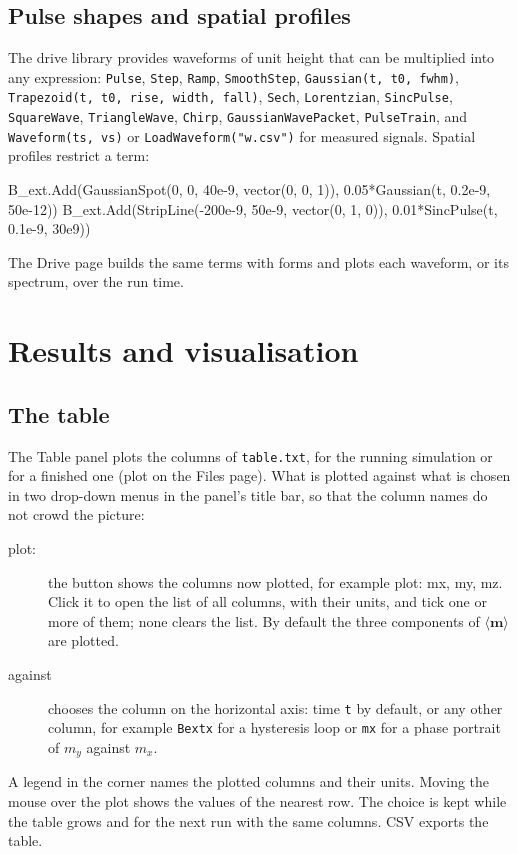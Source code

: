 \documentclass[11pt,a4paper,oneside]{book}
\newcommand{\code}[1]{\texttt{#1}}
\renewcommand{\_}{\textunderscore\allowbreak}
\newcommand{\menu}[1]{\textsf{#1}}
\begin{document}
\section{Pulse shapes and spatial profiles}

The drive library provides waveforms of unit height that can be multiplied into any expression:
\code{Pulse}, \code{Step}, \code{Ramp}, \code{SmoothStep}, \code{Gaussian(t, t0, fwhm)},
\code{Trapezoid(t, t0, rise, width, fall)}, \code{Sech}, \code{Lorentzian}, \code{SincPulse},
\code{SquareWave}, \code{TriangleWave}, \code{Chirp}, \code{GaussianWavePacket}, \code{PulseTrain}, and
\code{Waveform(ts, vs)} or \code{LoadWaveform("w.csv")} for measured signals. Spatial profiles restrict a term:
\begin{mxcode}
B_ext.Add(GaussianSpot(0, 0, 40e-9, vector(0, 0, 1)), 0.05*Gaussian(t, 0.2e-9, 50e-12))
B_ext.Add(StripLine(-200e-9, 50e-9, vector(0, 1, 0)), 0.01*SincPulse(t, 0.1e-9, 30e9))
\end{mxcode}
The \menu{Drive} page builds the same terms with forms and plots each waveform, or its spectrum, over the run time.

\chapter{Results and visualisation}\label{ch:output}

\section{The table}

The \menu{Table} panel plots the columns of \code{table.txt}, for the running simulation or for a finished one
(\menu{plot} on the Files page). What is plotted against what is chosen in two drop-down menus in the panel's
title bar, so that the column names do not crowd the picture:
\begin{description}
\item[plot:] the button shows the columns now plotted, for example \menu{plot: mx, my, mz}. Click it to open the
list of all columns, with their units, and tick one or more of them; \menu{none} clears the list. By default the
three components of $\langle\mathbf m\rangle$ are plotted.
\item[against] chooses the column on the horizontal axis: time \code{t} by default, or any other column, for
example \code{B\_extx} for a hysteresis loop or \code{mx} for a phase portrait of $m_y$ against $m_x$.
\end{description}
A legend in the corner names the plotted columns and their units. Moving the mouse over the plot shows the values
of the nearest row. The choice is kept while the table grows and for the next run with the same columns.
\menu{CSV} exports the table.
\end{document}
